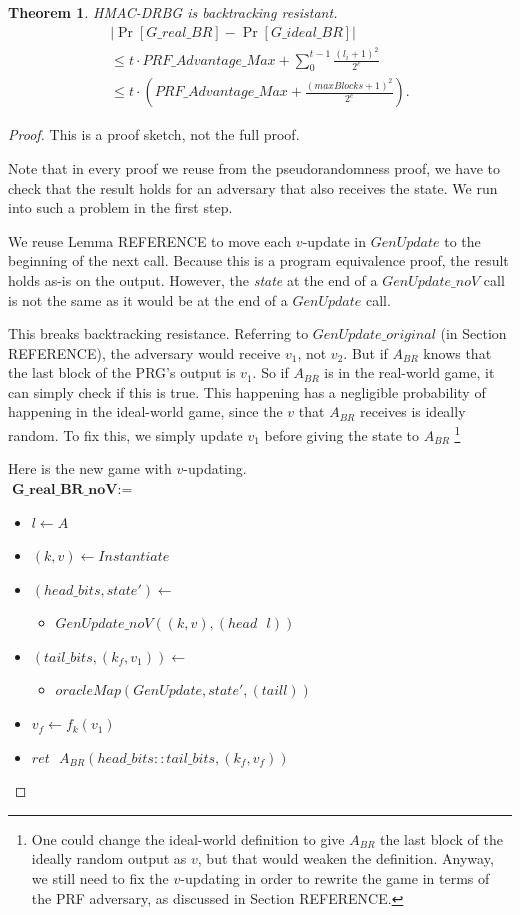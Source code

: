 \documentclass[12pt,lot, lof]{puthesis}
\newenvironment{game}
{ \begin{itemize}[noitemsep,nolistsep] 
}
{ \end{itemize}                  }
\newcommand{\s} {\textrm{ }}
\newcommand{\f}{\frac}
\newcommand{\lar}{\leftarrow}
\newtheorem{thm}{Theorem}
\begin{document}
\begin{thm}\label{thm:br} HMAC-DRBG is backtracking resistant. 
  \begin{gather*}
|\Pr[G\_real\_BR] - \Pr[G\_ideal\_BR]| \\
\leq t \cdot PRF\_Advantage\_Max + \sum_{0}^{t-1} \f{(l_i+1)^2}{2^c} \\ 
\leq t \cdot (PRF\_Advantage\_Max + \f{(maxBlocks + 1)^2}{2^c}).
\end{gather*}

\end{thm}
\begin{proof} This is a proof sketch, not the full proof.

Note that in every proof we reuse from the pseudorandomness proof, we have to check that the result holds for an adversary that also receives the state. We run into such a problem in the first step.

We reuse Lemma REFERENCE to move each $v$-update in $GenUpdate$ to the beginning of the next call. Because this is a program equivalence proof, the result holds as-is on the output. However, the \emph{state} at the end of a $GenUpdate\_noV$ call is not the same as it would be at the end of a $GenUpdate$ call. 

This breaks backtracking resistance. Referring to $GenUpdate\_original$ (in Section REFERENCE), the adversary would receive $v_1$, not $v_2$. But if $A_{BR}$ knows that the last block of the PRG's output is $v_1$. So if $A_{BR}$ is in the real-world game, it can simply check if this is true. This happening has a negligible probability of happening in the ideal-world game, since the $v$ that $A_{BR}$ receives is ideally random. To fix this, we simply update $v_1$ before giving the state to $A_{BR}$ \footnote{One could change the ideal-world definition to give $A_{BR}$ the last block of the ideally random output as $v$, but that would weaken the definition. Anyway, we still need to fix the $v$-updating in order to rewrite the game in terms of the PRF adversary, as discussed in Section REFERENCE.}

Here is the new game with $v$-updating.\\

$\textbf{G\_real\_BR\_noV} := $
\begin{game}
\item[] $l \leftarrow A$
\item[] $(k,v) \leftarrow Instantiate$
\item[] $(head\_bits, state') \lar$
  \begin{game}
    \item[]  $GenUpdate\_noV((k, v), (head \s l))$
  \end{game}
\item[] $(tail\_bits, (k_f, v_1)) \lar$
  \begin{game}
    \item[] $oracleMap(GenUpdate,state',(tail l))$
  \end{game}
\item[] $v_f \lar f_k(v_1)$
\item[] $ret \s A_{BR}(head\_bits :: tail\_bits, (k_f, v_f))$ \\
\end{game}


\end{proof}
\end{document}
